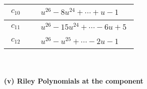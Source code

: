 \documentclass[1p]{elsarticle_modified}
\theoremstyle{definition}
\begin{document}
\begin{tabular}{m{50pt}|m{274pt}}
\hline $$\begin{aligned}c_{10}\end{aligned}$$&$\begin{aligned}
&u^{26}-8 u^{24}+\cdots+u-1
\end{aligned}$\\
\hline $$\begin{aligned}c_{11}\end{aligned}$$&$\begin{aligned}
&u^{26}-15 u^{24}+\cdots-6 u+5
\end{aligned}$\\
\hline $$\begin{aligned}c_{12}\end{aligned}$$&$\begin{aligned}
&u^{26}- u^{25}+\cdots-2 u-1
\end{aligned}$\\
\hline
\end{tabular}\\~\\
\newpage\renewcommand{\arraystretch}{1}
\flushleft \textbf{(v) Riley Polynomials at the component}\newline \\
\end{document}
